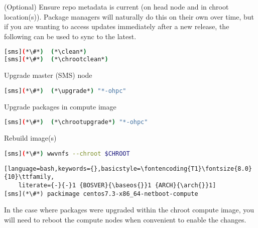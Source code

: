 \begin{enumerate*}
\item (Optional) Ensure repo metadata is current (on head node and in chroot
  location(s)). Package managers will naturally do this on their own over time,
  but if you are wanting to access updates immediately after a new release,
  the following can be used to sync to the latest.

\begin{lstlisting}[language=bash,keywords={}]
[sms](*\#*)  (*\clean*)
[sms](*\#*)  (*\chrootclean*)
\end{lstlisting}

\item Upgrade master (SMS) node

\begin{lstlisting}[language=bash,keywords={}]
[sms](*\#*)  (*\upgrade*) "*-ohpc"
\end{lstlisting}
  
\item Upgrade packages in compute image

\begin{lstlisting}[language=bash,keywords={}]
[sms](*\#*)  (*\chrootupgrade*) "*-ohpc"
\end{lstlisting}
  
\item Rebuild image(s)

\begin{lstlisting}[language=bash,keywords={}]
[sms](*\#*) wwvnfs --chroot $CHROOT
\end{lstlisting}
\fi

\begin{lstlisting}[language=bash,keywords={},basicstyle=\fontencoding{T1}\fontsize{8.0}{10}\ttfamily,
    literate={-}{-}1 {BOSVER}{\baseos{}}1 {ARCH}{\arch{}}1]
[sms](*\#*) packimage centos7.3-x86_64-netboot-compute
\end{lstlisting}
\fi

\end{enumerate*}

\noindent In the case where packages were upgraded within the chroot compute image,
you will need to reboot the compute nodes when convenient to enable the
changes.


\else

\fi
